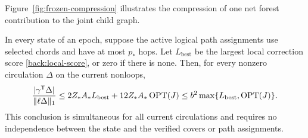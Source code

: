 Figure~\ref{fig:frozen-compression} illustrates the compression of one
net forest contribution to the joint child graph.


\begin{samepage}
\begin{lemma}
In every state of an epoch, suppose the active logical path
assignments use selected chords and have at most $p_*$ hops.
\label{lem:backend-reduction}
Let $L_{\mathrm{best}}$ be the largest local correction score
\eqref{back:local-score}, or zero if there is none.  Then, for every
nonzero circulation $\Delta$ on the current nonloops,
\begin{equation}
\label{back:reduction-bound}
 \frac{|\gamma^{\mathsf T}\Delta|}{\|\ell\Delta\|_1}
 \le 2Z_*A_*L_{\mathrm{best}}+12Z_*A_*\operatorname{OPT}(J)
 \le b^2\max\{L_{\mathrm{best}},\operatorname{OPT}(J)\}.
\end{equation}
This conclusion is simultaneous for all current circulations and
requires no independence between the state and the verified covers
or path assignments.
\end{lemma}
\end{samepage}


